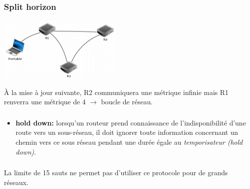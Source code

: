 \documentclass[svgnames,11pt]{beamer}
\begin{document}
\begin{frame}
    \frametitle{Split horizon}

    \begin{center}
        \centering
        \includegraphics[width=6cm]{ressources/split.png}
        \label{IMG}
        \end{center}
À la mise à jour suivante, R2 communiquera une métrique infinie mais R1 renverra une métrique de 4 $\rightarrow$ boucle de réseau.
\end{frame}

\begin{frame}
    \frametitle{}

    \begin{itemize}
        \item\textbf{hold down:} lorsqu'un routeur prend connaissance de l'indisponibilité d'une route vers un sous-réseau, il doit ignorer toute information concernant un chemin vers ce sous réseau pendant une durée égale au \emph{temporisateur (hold down)}.
    \end{itemize}
\end{frame}
\begin{frame}
    \frametitle{}

    \begin{aretenir}[Remarque]
        La limite de 15 sauts ne permet pas d'utiliser ce protocole pour de grands réseaux.
    \end{aretenir}

\end{frame}
\end{document}

